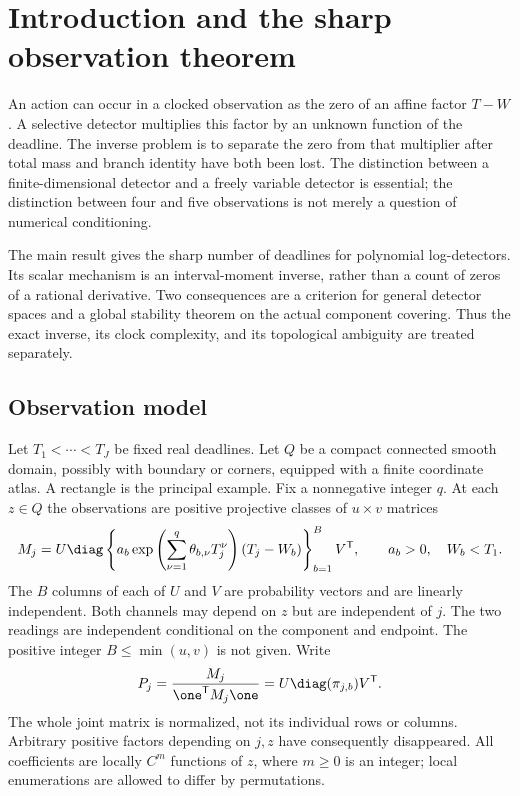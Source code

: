 \section{Introduction and the sharp observation theorem}
\label{sec:v83-main}

An action can occur in a clocked observation as the zero of an affine
factor $T-W$. A selective detector multiplies this factor by an unknown
function of the deadline. The inverse problem is to separate the zero
from that multiplier after total mass and branch identity have both been
lost. The distinction between a finite-dimensional detector and a freely
variable detector is essential; the distinction between four and five
observations is not merely a question of numerical conditioning.

The main result gives the sharp number of deadlines for polynomial
log-detectors. Its scalar mechanism is an interval-moment inverse, rather
than a count of zeros of a rational derivative. Two consequences are a
criterion for general detector spaces and a global stability theorem on
the actual component covering. Thus the exact inverse, its clock
complexity, and its topological ambiguity are treated separately.

\subsection{Observation model}
Let $T_1<\cdots<T_J$ be fixed real deadlines. Let $Q$ be a compact
connected smooth domain, possibly with boundary or corners, equipped with
a finite coordinate atlas. A rectangle is the principal example.
Fix a nonnegative integer $q$. At each $z\in Q$ the observations are
positive projective classes of $u\times v$ matrices
\begin{equation}\label{eq:v83-model}
 M_j=U\diag\left\{a_b\exp\left(\sum_{\nu=1}^q
             \theta_{b,\nu}T_j^\nu\right)(T_j-W_b)\right\}_{b=1}^B
 V^{\mathsf T},\qquad a_b>0,\quad W_b<T_1.
\end{equation}
The $B$ columns of each of $U$ and $V$ are probability vectors and are
linearly independent. Both channels may depend on $z$ but are independent
of $j$. The two readings are independent conditional on the component
and endpoint. The positive integer $B\le\min(u,v)$ is not given.
Write
\begin{equation}\label{eq:v83-probability}
 P_j=\frac{M_j}{\one^{\mathsf T}M_j\one}
     =U\diag(\pi_{j,b})V^{\mathsf T}.
\end{equation}
The whole joint matrix is normalized, not its individual rows or columns.
Arbitrary positive factors depending on $j,z$ have consequently disappeared.
All coefficients are locally $C^m$ functions of $z$, where $m\ge0$ is an
integer; local enumerations are allowed to differ by permutations.

